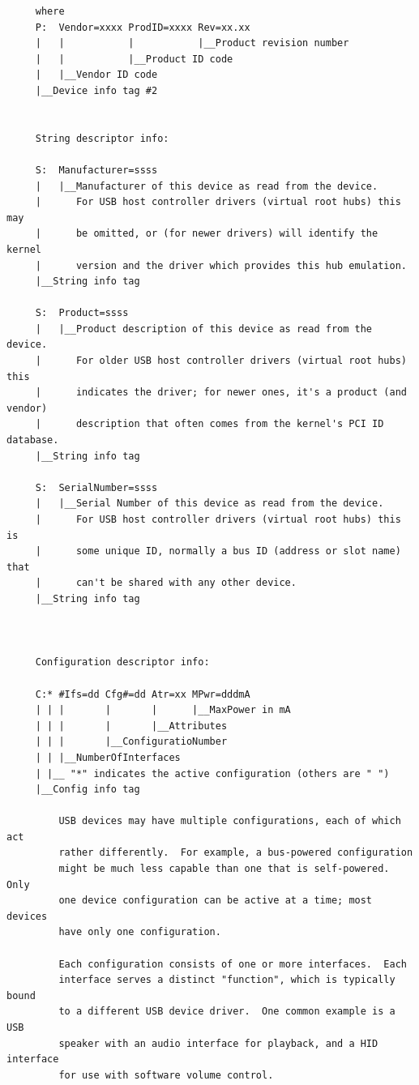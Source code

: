 {{{{{{{{{{{{{{{{{\begin{verbatim}
     where
     P:  Vendor=xxxx ProdID=xxxx Rev=xx.xx
     |   |           |           |__Product revision number
     |   |           |__Product ID code
     |   |__Vendor ID code
     |__Device info tag #2
     
     
     String descriptor info:
     
     S:  Manufacturer=ssss
     |   |__Manufacturer of this device as read from the device.
     |      For USB host controller drivers (virtual root hubs) this may
     |      be omitted, or (for newer drivers) will identify the kernel
     |      version and the driver which provides this hub emulation.
     |__String info tag
     
     S:  Product=ssss
     |   |__Product description of this device as read from the device.
     |      For older USB host controller drivers (virtual root hubs) this
     |      indicates the driver; for newer ones, it's a product (and vendor)
     |      description that often comes from the kernel's PCI ID database.
     |__String info tag
     
     S:  SerialNumber=ssss
     |   |__Serial Number of this device as read from the device.
     |      For USB host controller drivers (virtual root hubs) this is
     |      some unique ID, normally a bus ID (address or slot name) that
     |      can't be shared with any other device.
     |__String info tag
     
     
     
     Configuration descriptor info:
     
     C:* #Ifs=dd Cfg#=dd Atr=xx MPwr=dddmA
     | | |       |       |      |__MaxPower in mA
     | | |       |       |__Attributes
     | | |       |__ConfiguratioNumber
     | | |__NumberOfInterfaces
     | |__ "*" indicates the active configuration (others are " ")
     |__Config info tag
     
         USB devices may have multiple configurations, each of which act
         rather differently.  For example, a bus-powered configuration
         might be much less capable than one that is self-powered.  Only
         one device configuration can be active at a time; most devices
         have only one configuration.
     
         Each configuration consists of one or more interfaces.  Each
         interface serves a distinct "function", which is typically bound
         to a different USB device driver.  One common example is a USB
         speaker with an audio interface for playback, and a HID interface
         for use with software volume control.
     

\end{verbatim}}}}}}}}}}}}}}}}}}
